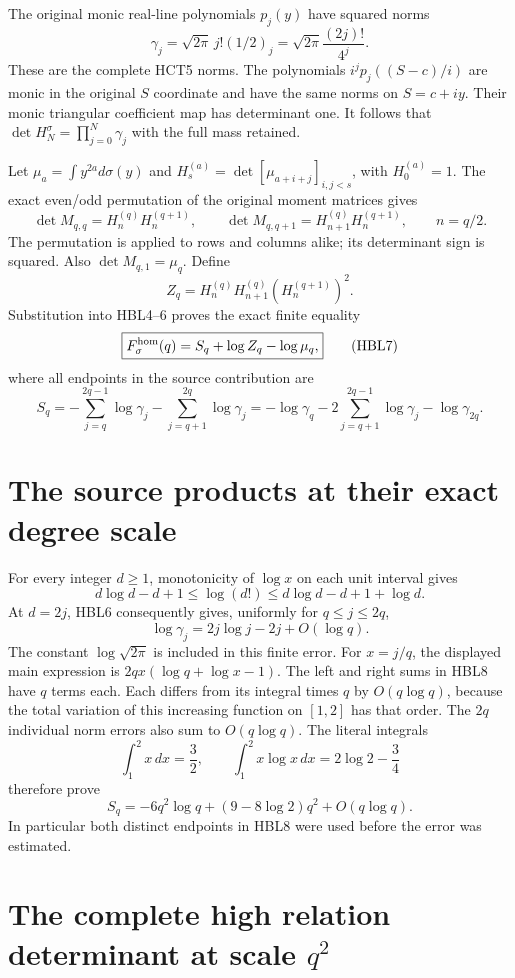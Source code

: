The original monic real-line polynomials $p_j(y)$ have squared norms
\[
 \gamma_j=\sqrt{2\pi}\,j!(1/2)_j
          =\sqrt{2\pi}\frac{(2j)!}{4^j}.
 \tag{HBL6}
\]
These are the complete HCT5 norms. The polynomials
$i^jp_j((S-c)/i)$ are monic in the original $S$ coordinate and have
the same norms on $S=c+iy$. Their monic triangular coefficient map
has determinant one. It follows that
$\det H_N^\sigma=\prod_{j=0}^N\gamma_j$ with the full mass retained.

Let $\mu_a=\int y^{2a}d\sigma(y)$ and
$H_s^{(a)}=\det[\mu_{a+i+j}]_{i,j<s}$, with $H_0^{(a)}=1$.
The exact even/odd permutation of the original moment matrices gives
\[
 \det M_{q,q}=H_n^{(q)}H_n^{(q+1)},\qquad
 \det M_{q,q+1}=H_{n+1}^{(q)}H_n^{(q+1)},\qquad n=q/2.
\]
The permutation is applied to rows and columns alike; its determinant
sign is squared. Also $\det M_{q,1}=\mu_q$. Define
\[
 Z_q=H_n^{(q)}H_{n+1}^{(q)}(H_n^{(q+1)})^2.
\]
Substitution into HBL4--6 proves the exact finite equality
\[
 \boxed{F_\sigma^{\rm hom}(q)=S_q+\log Z_q-\log\mu_q,}
 \tag{HBL7}
\]
where all endpoints in the source contribution are
\[
 S_q=-\sum_{j=q}^{2q-1}\log\gamma_j
     -\sum_{j=q+1}^{2q}\log\gamma_j
     =-\log\gamma_q-2\sum_{j=q+1}^{2q-1}\log\gamma_j
      -\log\gamma_{2q}.
 \tag{HBL8}
\]

\section{The source products at their exact degree scale}

For every integer $d\ge1$, monotonicity of $\log x$ on each unit
interval gives
\[
 d\log d-d+1\le\log(d!)
                \le d\log d-d+1+\log d.
\]
At $d=2j$, HBL6 consequently gives, uniformly for $q\le j\le2q$,
\[
 \log\gamma_j=2j\log j-2j+O(\log q).
\]
The constant $\log\sqrt{2\pi}$ is included in this finite error.
For $x=j/q$, the displayed main expression is
$2qx(\log q+\log x-1)$. The left and right sums in HBL8 have
$q$ terms each. Each differs from its integral times $q$ by
$O(q\log q)$, because the total variation of this increasing function
on $[1,2]$ has that order. The $2q$ individual norm errors also sum
to $O(q\log q)$. The literal integrals
\[
 \int_1^2x\,dx=\frac32,\qquad
 \int_1^2x\log x\,dx=2\log2-\frac34
\]
therefore prove
\[
 \boxed{S_q=-6q^2\log q+(9-8\log2)q^2+O(q\log q).}
 \tag{HBL9}
\]
In particular both distinct endpoints in HBL8 were used before the
error was estimated.

\section{The complete high relation determinant at scale $q^2$}

